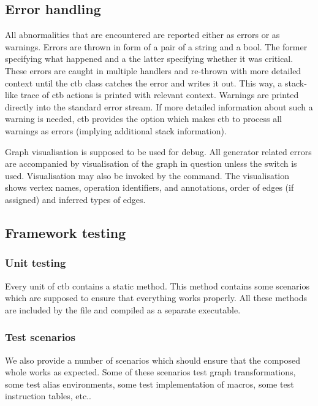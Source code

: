 \label{sec:testing}
\subsection*{Error handling}
All abnormalities that are encountered are reported either as errors or as warnings. Errors are thrown in form of a pair of a string and a bool. The former specifying what happened and a the latter specifying whether it was critical. These errors are caught in multiple  handlers and re-thrown with more detailed context until the ctb class catches the error and writes it out. This way, a stack-like trace of ctb actions is printed with relevant context.  Warnings are printed directly into the standard error stream. If more detailed information about such a warning is needed, ctb provides the  option which makes ctb to process all warnings as errors (implying additional stack information). 

Graph visualisation is supposed to be used for debug. All generator related errors are accompanied by visualisation of the graph in question unless the  switch is used. Visualisation may also be invoked by the  command. The visualisation shows vertex names, operation identifiers,  and  annotations, order of edges (if assigned) and inferred types of edges.

\subsection*{Framework testing}

\subsubsection{Unit testing}
Every unit of ctb contains a static  method. This method contains some scenarios which are supposed to ensure that everything works properly. All these methods are included by the  file and compiled as a separate executable.

\subsubsection{Test scenarios}
We also provide a number of scenarios which should ensure that the composed whole works as expected. Some of these scenarios test graph transformations, some test alias environments, some test implementation of macros, some test instruction tables, etc..

